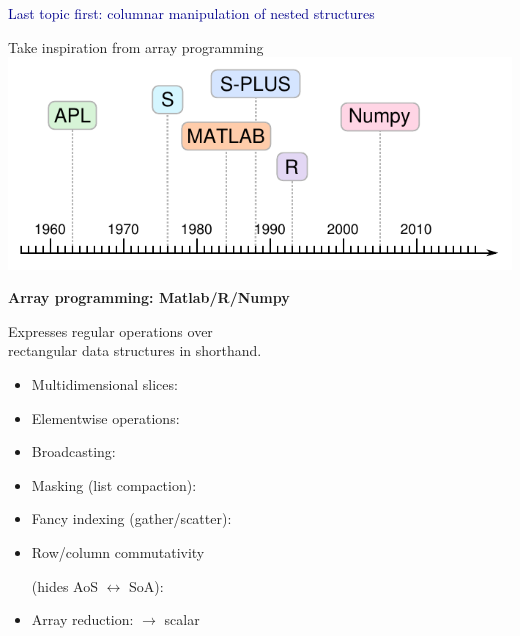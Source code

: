 \documentclass[aspectratio=169]{beamer}
\begin{document}
\begin{frame}{}
\Large
\vspace{1 cm}
\begin{center}
\textcolor{darkblue}{Last topic first: columnar manipulation of nested structures}
\end{center}
\end{frame}

\begin{frame}[fragile]{Take inspiration from array programming}
\vspace{0.1 cm}
\hfill \includegraphics[height=2.75 cm]{apl-timeline.pdf}

\vspace{-2.15 cm}
{\bf\large Array programming: Matlab/R/Numpy}

\vspace{0.5 cm}
Expresses regular operations over \\ rectangular data structures in shorthand.

\vspace{0.25 cm}
\begin{itemize}\setlength{\itemsep}{0.15 cm}
\item Multidimensional slices: 
\item Elementwise operations: 
\item Broadcasting: 
\item Masking (list compaction): 
\item Fancy indexing (gather/scatter): 
\item Row/column commutativity 

(hides AoS $\leftrightarrow$ SoA): 
\item Array reduction:  $\to$ scalar
\end{itemize}
\end{frame}
\end{document}
